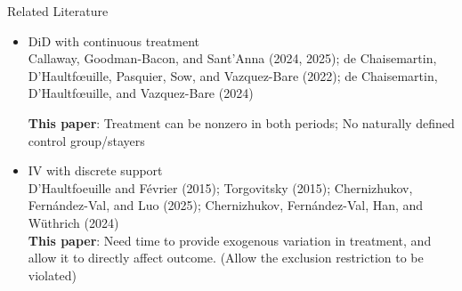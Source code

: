 \documentclass[aspectratio=1610, 9pt]{beamer}
\begin{document}
\begin{frame}{Related Literature}
   
    \begin{itemize}
        \item DiD with continuous treatment \\
         \vspace{0.15cm}
        Callaway, Goodman-Bacon, and Sant’Anna (2024, 2025); de Chaisemartin, D’Haultfœuille, Pasquier, Sow, and Vazquez-Bare (2022); de Chaisemartin, D’Haultfœuille, and Vazquez-Bare (2024)
        
        \vspace{0.22cm}
        \textbf{This paper}: Treatment can be nonzero in both periods; No naturally defined control group/stayers

    \vspace{0.35cm}
        \item IV with discrete support\\
         \vspace{0.15cm}
        D’Haultfoeuille and Février (2015); Torgovitsky (2015); Chernizhukov, Fernández-Val, and Luo (2025); Chernizhukov, Fernández-Val, Han, and Wüthrich (2024)\\
     \vspace{0.22cm}
        \textbf{This paper}: Need time to provide exogenous variation in treatment,  and allow it to directly affect outcome. 
      (Allow the exclusion restriction to be violated)
        
    \end{itemize}

\end{frame}
\end{document}
